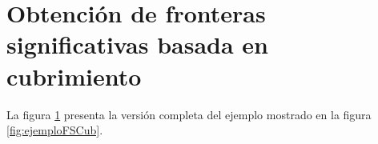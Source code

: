 \section{Obtención de fronteras significativas basada en cubrimiento}\label{EXE:sfbc}
La figura \ref{EXE:sfbc} presenta la versión completa del ejemplo mostrado en la figura \ref{fig:ejemploFSCub}.
\endgroup
\begin{figure}[H]
  \centerfloat
  \captionsetup{justification=centering}


\end{figure}

